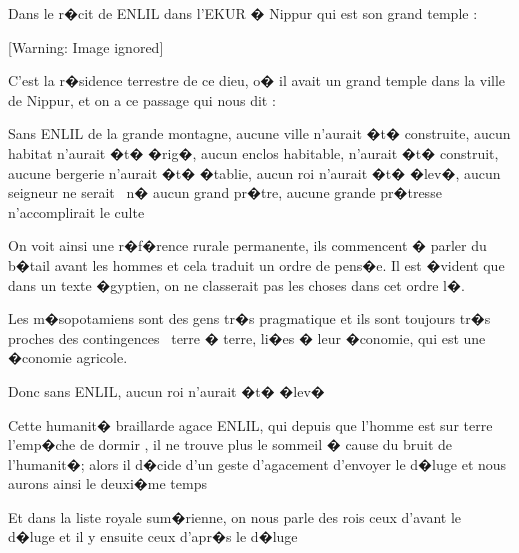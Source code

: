 \documentclass{article}
\begin{document}
\bigskip


\bigskip


\bigskip


\bigskip


\bigskip


\bigskip


\bigskip

Dans le r�cit de ENLIL dans l'EKUR � Nippur qui est son grand temple :


\bigskip

  [Warning: Image ignored] %
 


\bigskip

C'est la r�sidence terrestre de ce dieu, o� il avait un grand temple dans la ville de Nippur, et on a ce passage qui nous dit :


\bigskip

{\textquotedbl}Sans ENLIL de la grande montagne, aucune ville n'aurait �t� construite, aucun habitat n'aurait �t� �rig�, aucun enclos habitable, n'aurait �t� construit, aucune bergerie n'aurait �t� �tablie, aucun roi n'aurait �t� �lev�, aucun seigneur ne serait \ n� aucun grand pr�tre, aucune grande pr�tresse n'accomplirait le culte {\textquotedbl} 


\bigskip

On voit ainsi une r�f�rence rurale permanente, ils commencent � parler du b�tail avant les hommes et cela traduit un ordre de pens�e. Il est �vident que dans un texte �gyptien, on ne classerait pas les choses dans cet ordre l�.

Les m�sopotamiens sont des gens tr�s pragmatique et ils sont toujours tr�s proches des contingences \ terre � terre, li�es � leur �conomie, qui est une �conomie agricole.


\bigskip

Donc sans ENLIL, aucun roi n'aurait �t� �lev�

Cette humanit� braillarde agace ENLIL, qui depuis que l'homme est sur terre l'emp�che de dormir , il ne trouve plus le sommeil � cause du bruit de l'humanit�; alors il d�cide d'un geste d'agacement d'envoyer le d�luge et nous aurons ainsi le deuxi�me temps


\bigskip

Et dans la liste royale sum�rienne, on nous parle des rois {\textquotedbl} ceux d'avant le d�luge{\textquotedbl} et il y ensuite ceux {\textquotedbl} d'apr�s le d�luge {\textquotedbl}
\end{document}
